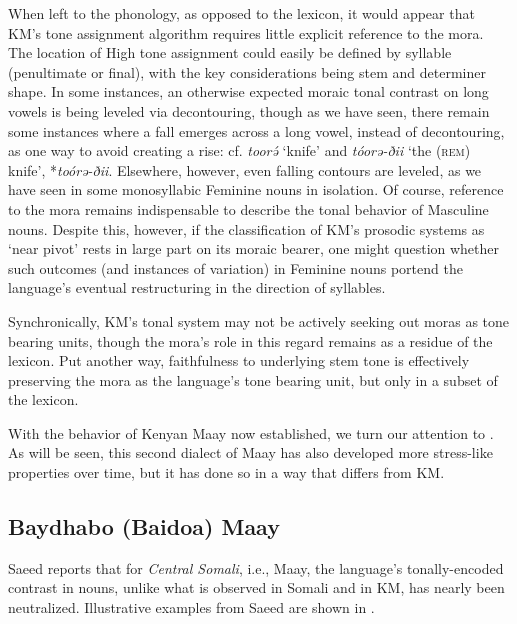 \documentclass[output=paper,colorlinks,citecolor=brown]{langscibook}
\begin{document}
When left to the phonology, as opposed to the lexicon, it would appear that KM's tone assignment algorithm requires little explicit reference to the mora. The location of High tone assignment could easily be defined by syllable (penultimate or final), with the key considerations being stem and determiner shape. In some instances, an otherwise expected moraic tonal contrast on long vowels is being leveled via decontouring, though as we have seen, there remain some instances where a fall emerges across a long vowel, instead of decontouring, as one way to avoid creating a rise: cf. \textit{toorə́} `knife' and \textit{tóorə-ðii} `the (\textsc{rem}) knife', *\textit{toórə-ðii}. Elsewhere, however, even falling contours are leveled, as we have seen in some monosyllabic Feminine nouns in isolation. Of course, reference to the mora remains indispensable to describe the tonal behavior of Masculine nouns. Despite this, however, if the classification of KM's prosodic systems as `near pivot' rests in large part on its moraic  bearer, one might question whether such outcomes (and instances of variation) in Feminine nouns portend the language's eventual restructuring in the direction of syllables.\largerpage

Synchronically, KM's tonal system may not be actively seeking out moras as tone bearing units, though the mora's role in this regard remains as a residue of the lexicon. Put another way, faithfulness to underlying stem tone is effectively preserving the mora as the language's tone bearing unit, but only in a subset of the lexicon.

With the behavior of Kenyan Maay now established, we turn our attention to . As will be seen, this second dialect of Maay has also developed more stress-like properties over time, but it has done so in a way that differs from KM.

\subsection{Baydhabo (Baidoa) Maay}

Saeed \citeyearpar{Saeed1982} reports that for \textit{Central Somali}, i.e., Maay, the language's tonally-encoded  contrast in nouns, unlike what is observed in Somali and in KM, has nearly been  neutralized. Illustrative examples from Saeed \citeyearpar{Saeed1982} are shown in . 
\end{document}
